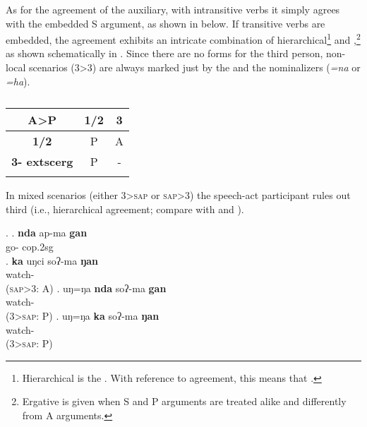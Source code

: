 As for the agreement of the auxiliary, with intransitive verbs it simply agrees with the embedded S argument, as shown in \Next[a] below. If transitive verbs are embedded, the agreement exhibits an intricate combination of hierarchical\footnote{Hierarchical  is the  \citep[10]{Siewierska1998On-nominal}. With reference to agreement, this means that   \citep[66]{Nichols1992Language}.} and  ,\footnote{Ergative  is given when S and P arguments are treated alike and differently from A arguments. 
} as shown schematically in .  Since there are no forms for the third person, non-local scenarios (3>3) are always marked just by the  and the nominalizers (\emph{=na} or \emph{=ha}). 


\begin{table}[htp]
\begin{center}
\begin{tabular}{ccc}
\lsptoprule
{\bf A>P}	&{\bf 1/2}&{\bf 3}\\
\midrule
 {\bf 1/2}&P&A\\
 {\bf 3-	extsc{erg}}	&P&-\\
\lspbottomrule
\end{tabular}
\caption{}
\label{align-sum-cop}
\end{center} 
\end{table}


In mixed scenarios (either 3>\textsc{sap} or \textsc{sap}>3)  the speech-act participant rules out third (i.e., hierarchical agreement; compare \Next[b] with \Next[c] and \Next[d]). 

\ex. \ag. {\bf nda}  ap-ma {\bf gan}\\
 go- {\sc cop.2sg} \\
\bg. {\bf ka} uŋci soʔ-ma  {\bf ŋan}\\
  watch-  \\  
	(\textsc{sap}>3: A)
\bg. uŋ=ŋa {\bf nda}  soʔ-ma {\bf gan}\\
    watch-  \\  
	(3>\textsc{sap}: P)
\bg. uŋ=ŋa {\bf ka}  soʔ-ma {\bf ŋan}\\
    watch-  \\  
	(3>\textsc{sap}: P)

